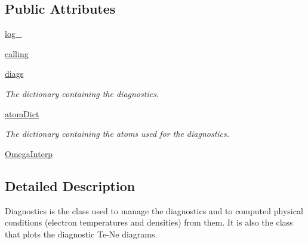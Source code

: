 \subsection*{Public Attributes}
\begin{DoxyCompactItemize}
\item 
\hyperlink{classpyneb_1_1core_1_1diags_1_1_diagnostics_afd87151907f32bc0dc45f0171b61374e}{log\-\_\-}
\item 
\hyperlink{classpyneb_1_1core_1_1diags_1_1_diagnostics_ab25fa7ebe84b603684dee62410c1e34c}{calling}
\item 
\hyperlink{classpyneb_1_1core_1_1diags_1_1_diagnostics_af600b32fdefbb2e4ed370e8dd91bfc7b}{diags}
\begin{DoxyCompactList}\small\item\em The dictionary containing the diagnostics. \end{DoxyCompactList}\item 
\hyperlink{classpyneb_1_1core_1_1diags_1_1_diagnostics_a468cb618d893dc9d4d5d4bc1d96b0ee4}{atom\-Dict}
\begin{DoxyCompactList}\small\item\em The dictionary containing the atoms used for the diagnostics. \end{DoxyCompactList}\item 
\hyperlink{classpyneb_1_1core_1_1diags_1_1_diagnostics_a9fb4568356c398593832b0d4f2eb18d9}{Omega\-Interp}
\end{DoxyCompactItemize}


\subsection{Detailed Description}
\begin{DoxyVerb}Diagnostics is the class used to manage the diagnostics and to computed physical conditions 
    (electron temperatures and densities) from them. 
It is also the class that plots the diagnostic Te-Ne diagrams.\end{DoxyVerb}
 

